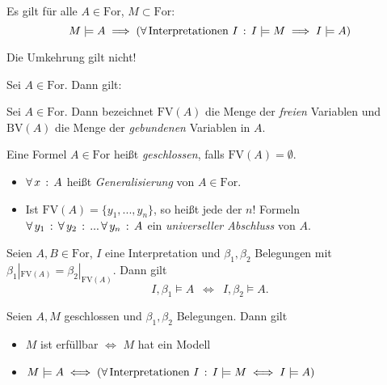 \documentclass{cheat-sheet}
\newcommand{\For}{\mathrm{For}} %
\newcommand{\FV}{\mathrm{FV}} %
\newcommand{\BV}{\mathrm{BV}} %
\begin{document}

\begin{prop}
  Es gilt für alle $A \in \For$, $M \subset \For$:
  \[ M \models A \implies (\forall \, {\text{Interpretationen } I} \,:\, I \models M \implies I \models A) \]
\end{prop}

\begin{acht}
  Die Umkehrung gilt nicht!
\end{acht}

\begin{prop}
  Sei $A \in \For$. Dann gilt:
  \begin{itemize}
  \end{itemize}
\end{prop}

\begin{defn}
  Sei $A \in \For$. Dann bezeichnet $\FV(A)$ die Menge der \emph{freien} Variablen und $\BV(A)$ die Menge der \emph{gebundenen} Variablen in $A$.
\end{defn}

\begin{defn}
  Eine Formel $A \in \For$ heißt \emph{geschlossen}, falls $\FV(A) = \emptyset$.
\end{defn}

\begin{defn}
  \begin{itemize}
    \item $\forall \, {x} \,:\, A$ heißt \emph{Generalisierung} von $A \in \For$.
    \item Ist $\FV(A) = \{ y_1, ..., y_n \}$, so heißt jede der $n!$ Formeln $\forall \, {y_1} \,:\, \forall \, {y_2} \,:\, ...\, \forall \, {y_n} \,:\, A$ ein \emph{universeller Abschluss} von $A$.
  \end{itemize}
\end{defn}

\begin{satz}[Koinzidenzlemma]
  Seien $A, B \in \For$, $I$ eine Interpretation und $\beta_1, \beta_2$ Belegungen mit $\beta_1|_{\FV(A)} = \beta_2|_{\FV(A)}$. Dann gilt
  \[ I, \beta_1 \models A \enspace\iff\enspace I, \beta_2 \models A. \]
\end{satz}

\begin{kor}
  Seien $A, M$ geschlossen und $\beta_1, \beta_2$ Belegungen. Dann gilt
  \begin{itemize}
    \item $M$ ist erfüllbar $\iff$ $M$ hat ein Modell
    \item $M \models A \iff (\forall \, {\text{Interpretationen } I} \,:\, I \models M \iff I \models A)$
  \end{itemize}
\end{kor}
\end{document}
